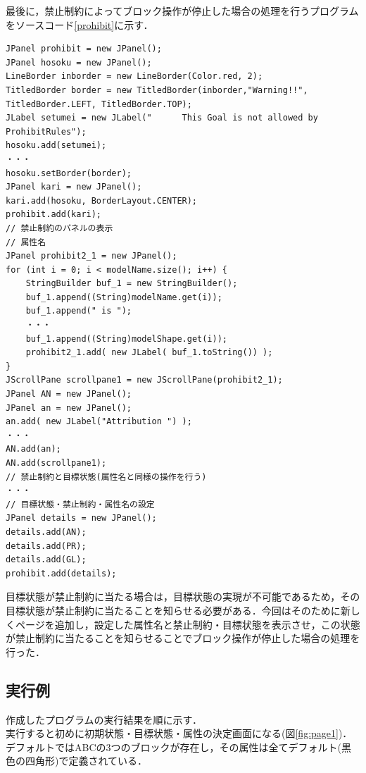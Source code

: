 \documentclass[uplatex,12pt]{jsarticle}
\begin{document}
最後に，禁止制約によってブロック操作が停止した場合の処理を行うプログラムをソースコード\ref{prohibit}に示す．
\begin{lstlisting}[caption=ブロックの状態を表すプログラム,label=prohibit]
JPanel prohibit = new JPanel();
JPanel hosoku = new JPanel();
LineBorder inborder = new LineBorder(Color.red, 2);
TitledBorder border = new TitledBorder(inborder,"Warning!!", TitledBorder.LEFT, TitledBorder.TOP);
JLabel setumei = new JLabel("      This Goal is not allowed by ProhibitRules");
hosoku.add(setumei);
・・・
hosoku.setBorder(border);
JPanel kari = new JPanel();
kari.add(hosoku, BorderLayout.CENTER);
prohibit.add(kari);
// 禁止制約のパネルの表示
// 属性名
JPanel prohibit2_1 = new JPanel();
for (int i = 0; i < modelName.size(); i++) {
	StringBuilder buf_1 = new StringBuilder();
	buf_1.append((String)modelName.get(i));
	buf_1.append(" is ");
	・・・
	buf_1.append((String)modelShape.get(i));
	prohibit2_1.add( new JLabel( buf_1.toString()) );
}
JScrollPane scrollpane1 = new JScrollPane(prohibit2_1);
JPanel AN = new JPanel();
JPanel an = new JPanel();
an.add( new JLabel("Attribution ") );
・・・
AN.add(an);
AN.add(scrollpane1);
// 禁止制約と目標状態(属性名と同様の操作を行う)
・・・
// 目標状態・禁止制約・属性名の設定
JPanel details = new JPanel();
details.add(AN);
details.add(PR);
details.add(GL);
prohibit.add(details);
\end{lstlisting}
目標状態が禁止制約に当たる場合は，目標状態の実現が不可能であるため，その目標状態が禁止制約に当たることを知らせる必要がある．今回はそのために新しくページを追加し，設定した属性名と禁止制約・目標状態を表示させ，この状態が禁止制約に当たることを知らせることでブロック操作が停止した場合の処理を行った．

\subsection{実行例}
作成したプログラムの実行結果を順に示す．\\
\clearpage
実行すると初めに初期状態・目標状態・属性の決定画面になる(図\ref{fig:page1})．デフォルトではABCの3つのブロックが存在し，その属性は全てデフォルト(黒色の四角形)で定義されている．\\
\end{document}
